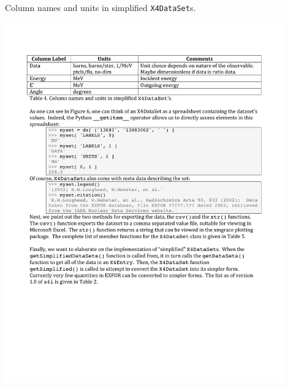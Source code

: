 \documentclass[11pt]{article}
\begin{document}
\begin{table}
\caption{Column names and units in simplified \texttt{X4DataSet}s.}
\begin{center}
\includegraphics[width=0.9\textwidth]{tables/table4}
\end{center}
\label{table:columns}
\end{table}%
\end{document}
